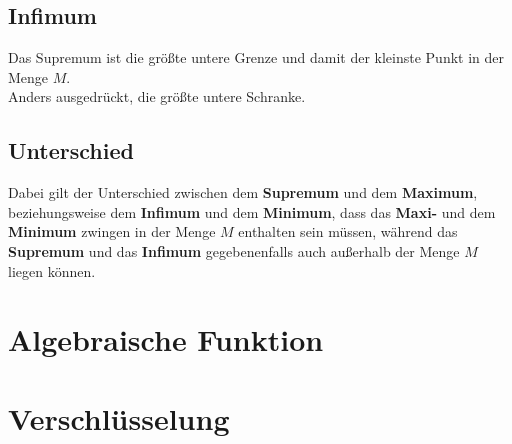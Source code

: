 \documentclass[11pt]{article}
\begin{document}
    \subsection{Infimum}\label{subsec:infimum}
    Das Supremum ist die größte untere Grenze und damit der kleinste Punkt in der Menge $M$.\\
    Anders ausgedrückt, die größte untere Schranke.

    \subsection{Unterschied}\label{subsec:unterschied}
    Dabei gilt der Unterschied zwischen dem \textbf{Supremum} und dem \textbf{Maximum}, beziehungsweise dem \textbf{Infimum} und dem \textbf{Minimum}, dass
    das \textbf{Maxi-} und dem \textbf{Minimum} zwingen in der Menge $M$ enthalten sein müssen, während das \textbf{Supremum} und das \textbf{Infimum} gegebenenfalls auch außerhalb der Menge $M$ liegen können.

    \section{Algebraische Funktion}\label{sec:gruppen}
    

    \section{Verschlüsselung}\label{sec:verschluesselung}
    
\end{document}
